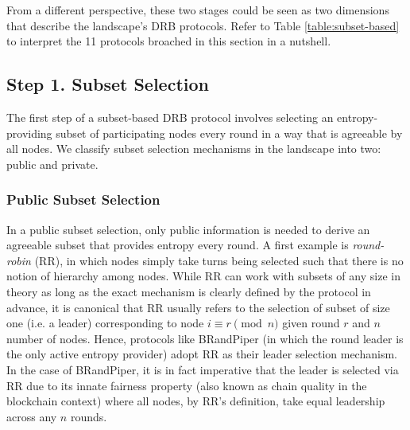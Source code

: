 \documentclass[letterpaper,twocolumn,10pt]{article}
\theoremstyle{definition}
\theoremstyle{remark}
\begin{document}
From a different perspective, these two stages could be seen as two dimensions that describe the landscape's DRB protocols. Refer to Table \ref{table:subset-based} to interpret the 11 protocols broached in this section in a nutshell.

\subsection{Step 1. Subset Selection}
The first step of a subset-based DRB protocol involves selecting an entropy-providing subset of participating nodes every round in a way that is agreeable by all nodes. We classify subset selection mechanisms in the landscape into two: public and private.

\subsubsection{Public Subset Selection}
\label{subsubsection:public-subset-selection}
In a public subset selection, only public information is needed to derive an agreeable subset that provides entropy every round. A first example is \textit{round-robin} (RR), in which nodes simply take turns being selected such that there is no notion of hierarchy among nodes. While RR can work with subsets of any size in theory as long as the exact mechanism is clearly defined by the protocol in advance, it is canonical that RR usually refers to the selection of subset of size one (i.e. a leader) corresponding to node $i \equiv r \pmod n$ given round $r$ and $n$ number of nodes. Hence, protocols like BRandPiper \cite{bhat2020randpiper} (in which the round leader is the only active entropy provider) adopt RR as their leader selection mechanism. In the case of BRandPiper, it is in fact imperative that the leader is selected via RR due to its innate fairness property \cite{azouvi2018winning} (also known as chain quality \cite{garay2015bitcoin} in the blockchain context) where all nodes, by RR's definition, take equal leadership across any $n$ rounds.
\end{document}
